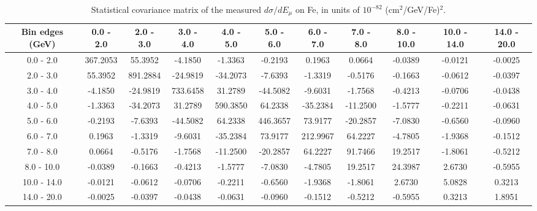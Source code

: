 \documentclass[aps,prl,twocolumn,superscriptaddress,nofootinbib]{revtex4-1}
\begin{document}
\begin{turnpage}
 \begin{table}[h!]
  \centering
  \caption{Statistical covariance matrix of the measured $d\sigma/dE_{\mu}$ on Fe, in units of $10^{-82}$ (cm$^{2}$/GeV/Fe)$^{2}$.}
    \begin{tabular}{c||cccccccccc}
      Bin edges (GeV) & 0.0 - 2.0 & 2.0 - 3.0 & 3.0 - 4.0 & 4.0 - 5.0 & 5.0 - 6.0 & 6.0 - 7.0 & 7.0 - 8.0 & 8.0 - 10.0 & 10.0 - 14.0 & 14.0 - 20.0 \\
\hline \hline
        0.0 - 2.0 & 367.2053 & 55.3952 & -4.1850 & -1.3363 & -0.2193 &  0.1963 &  0.0664 & -0.0389 & -0.0121 & -0.0025 \\
        2.0 - 3.0 & 55.3952 & 891.2884 & -24.9819 & -34.2073 & -7.6393 & -1.3319 & -0.5176 & -0.1663 & -0.0612 & -0.0397 \\
        3.0 - 4.0 & -4.1850 & -24.9819 & 733.6458 & 31.2789 & -44.5082 & -9.6031 & -1.7568 & -0.4213 & -0.0706 & -0.0438 \\
        4.0 - 5.0 & -1.3363 & -34.2073 & 31.2789 & 590.3850 & 64.2338 & -35.2384 & -11.2500 & -1.5777 & -0.2211 & -0.0631 \\
        5.0 - 6.0 & -0.2193 & -7.6393 & -44.5082 & 64.2338 & 446.3657 & 73.9177 & -20.2857 & -7.0830 & -0.6560 & -0.0960 \\
        6.0 - 7.0 &  0.1963 & -1.3319 & -9.6031 & -35.2384 & 73.9177 & 212.9967 & 64.2227 & -4.7805 & -1.9368 & -0.1512 \\
        7.0 - 8.0 &  0.0664 & -0.5176 & -1.7568 & -11.2500 & -20.2857 & 64.2227 & 91.7466 & 19.2517 & -1.8061 & -0.5212 \\
       8.0 - 10.0 & -0.0389 & -0.1663 & -0.4213 & -1.5777 & -7.0830 & -4.7805 & 19.2517 & 24.3987 &  2.6730 & -0.5955 \\
      10.0 - 14.0 & -0.0121 & -0.0612 & -0.0706 & -0.2211 & -0.6560 & -1.9368 & -1.8061 &  2.6730 &  5.0828 &  0.3213 \\
      14.0 - 20.0 & -0.0025 & -0.0397 & -0.0438 & -0.0631 & -0.0960 & -0.1512 & -0.5212 & -0.5955 &  0.3213 &  1.8951 \\
    \end{tabular}
  \label{tablecov:Fe_Statistical_Emu}
  \end{table}
\end{turnpage}
\end{document}
